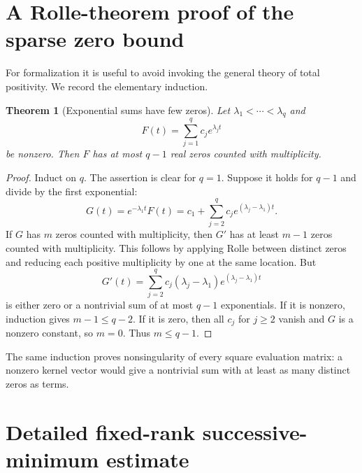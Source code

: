 \documentclass[11pt,oneside]{article}
\newtheorem{theorem}{Theorem}[section]
\theoremstyle{definition}
\theoremstyle{remark}
\begin{document}
\appendix

\section{A Rolle-theorem proof of the sparse zero bound}
\label{app:rolle}

For formalization it is useful to avoid invoking the general theory of total positivity.
We record the elementary induction.

\begin{theorem}[Exponential sums have few zeros]
Let $\lambda_1<\cdots<\lambda_q$ and
\[
 F(t)=\sum_{j=1}^q c_je^{\lambda_jt}
\]
be nonzero.  Then $F$ has at most $q-1$ real zeros counted with multiplicity.
\end{theorem}

\begin{proof}
Induct on $q$.  The assertion is clear for $q=1$.  Suppose it holds for $q-1$ and divide by
the first exponential:
\[
 G(t)=e^{-\lambda_1t}F(t)
     =c_1+\sum_{j=2}^q c_je^{(\lambda_j-\lambda_1)t}.
\]
If $G$ has $m$ zeros counted with multiplicity, then $G'$ has at least $m-1$ zeros counted with
multiplicity.  This follows by applying Rolle between distinct zeros and reducing each positive
multiplicity by one at the same location.  But
\[
 G'(t)=\sum_{j=2}^q c_j(\lambda_j-\lambda_1)e^{(\lambda_j-\lambda_1)t}
\]
is either zero or a nontrivial sum of at most $q-1$ exponentials.  If it is nonzero, induction
gives $m-1\le q-2$.  If it is zero, then all $c_j$ for $j\ge2$ vanish and $G$ is a nonzero
constant, so $m=0$.  Thus $m\le q-1$.
\end{proof}

The same induction proves nonsingularity of every square evaluation matrix: a nonzero kernel
vector would give a nontrivial sum with at least as many distinct zeros as terms.

\section{Detailed fixed-rank successive-minimum estimate}
\label{app:fixed-rank}
\end{document}
